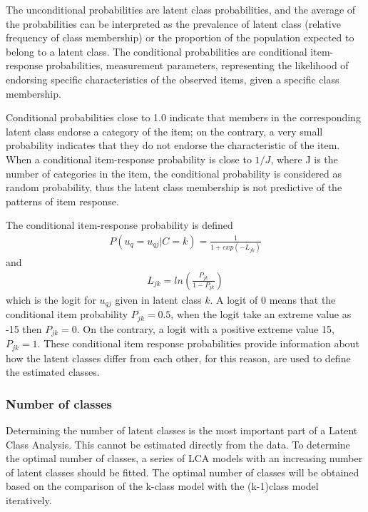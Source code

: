 \documentclass[12pt,a4paper,oneside]{reedthesis}
\begin{document}
The unconditional probabilities are latent class probabilities, and the average of the probabilities can be interpreted as the prevalence of latent class (relative frequency of class membership) or the proportion of the population expected to belong to a latent class. The conditional probabilities are conditional item-response probabilities, measurement parameters, representing the likelihood of endorsing specific characteristics of the observed items, given a specific class membership.

Conditional probabilities close to 1.0 indicate that members in the corresponding latent class endorse a category of the item; on the contrary, a very small probability indicates that they do not endorse the characteristic of the item. When a conditional item-response probability is close to \(1/J\), where J is the number of categories in the item, the conditional probability is considered as random probability, thus the latent class membership is not predictive of the patterns of item response.

The conditional item-response probability is defined
\begin{align}
P(u_q = u_{qj}|C=k) = \frac{1}{1+exp(-L_{jk})}
\end{align}
and
\begin{align}
L_{jk}=ln(\frac{P_{jk}}{1-P_{jk}})
\end{align}
which is the logit for \(u_{qj}\) given in latent class \(k\). A logit of 0 means that the conditional item probability \(P_{jk}=0.5\), when the logit take an extreme value as -15 then \(P_{jk}=0\). On the contrary, a logit with a positive extreme value 15, \(P_{jk}=1\). These conditional item response probabilities provide information about how the latent classes differ from each other, for this reason, are used to define the estimated classes.

\hypertarget{number-of-classes}{%
\subsubsection{Number of classes}\label{number-of-classes}}

Determining the number of latent classes is the most important part of a Latent Class Analysis. This cannot be estimated directly from the data. To determine the optimal number of classes, a series of LCA models with an increasing number of latent classes should be fitted. The optimal number of classes will be obtained based on the comparison of the k-class model with the (k-1)class model iteratively.
\end{document}
